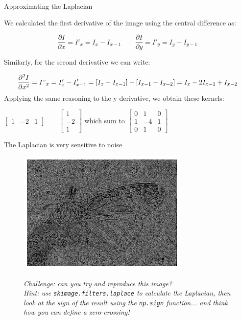 \documentclass[9pt, aspectratio=169]{beamer}
\begin{document}
\begin{frame}
    {Approximating the Laplacian}

    We calculated the first derivative of the image using the central difference as:

    \Large
    $$\frac{\partial I}{\partial x} = I'_x = I_x - I_{x-1} \qquad \frac{\partial I}{\partial y} = I'_y = I_y - I_{y-1}$$

    \pause
    \normalsize
    Similarly, for the second derivative we can write:

    \Large
    $$\frac{\partial^2 I}{\partial x^2} = I"_x = I'_x - I'_{x-1} = [I_x - I_{x-1}] - [I_{x-1} - I_{x-2}] = I_x - 2I_{x-1} + I_{x-2}$$
    \pause
    \normalsize
    Applying the same reasoning to the y derivative, we obtain these kernels:

    \centering

    $\begin{bmatrix}
            1 & -2 & 1
        \end{bmatrix}
        \qquad
        \begin{bmatrix}
            1  \\
            -2 \\
            1
        \end{bmatrix}
    $
    which sum to  $\begin{bmatrix}
            0 & 1  & 0 \\
            1 & -4 & 1 \\
            0 & 1  & 0
        \end{bmatrix}$
\end{frame}

\begin{frame}
    {The Laplacian is very sensitive to noise}
    \begin{figure}
        \includegraphics[width=.5\textwidth]{laplacian_zero_crossing_no_smooth.png}
        \caption{\small{\color{gray}{Zero crossing of the Laplacian of our butterfly image}\color{black}}}
        \pause
        \textit{Challenge: can you try and reproduce this image?\\ Hint: use \texttt{skimage.filters.laplace} to calculate the Laplacian, then look at the sign of the result using the \texttt{np.sign} function... and think how you can define a zero-crossing!}
    \end{figure}
\end{frame}
\end{document}
